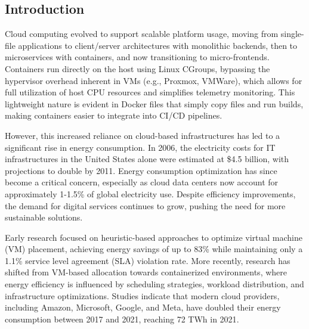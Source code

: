 \begin{multicols}{2}
\tableofcontents
\section{Introduction}
Cloud computing evolved to support scalable platform usage, moving from single-file applications to client/server 
architectures with monolithic backends, then to microservices with containers, and now transitioning to micro-frontends. 
Containers run directly on the host using Linux CGroups, bypassing the hypervisor overhead inherent in VMs (e.g., 
Proxmox, VMWare), which allows for full utilization of host CPU resources and simplifies telemetry monitoring. 
This lightweight nature is evident in Docker files that simply copy files and run builds, making containers easier to integrate 
into CI/CD pipelines.

However, this increased reliance on cloud-based infrastructures has led to a significant rise in energy 
consumption. In 2006, the electricity costs for IT infrastructures in the United States alone were 
estimated at \$4.5 billion, with projections to double by 2011\cite{beloglazov_energy_2010}. Energy 
consumption optimization has since become a critical concern, especially as cloud data centers now account 
for approximately 1-1.5\% of global electricity use\cite{IEADataCentres}. Despite efficiency improvements, the 
demand for digital services continues to grow, pushing the need for more sustainable solutions.

Early research focused on heuristic-based approaches to optimize virtual machine (VM) placement, achieving 
energy savings of up to 83\% while maintaining only a 1.1\% service level agreement (SLA) violation 
rate\cite{beloglazov_energy_2010}. More recently, research has shifted from VM-based allocation towards 
containerized environments, where energy efficiency is influenced by scheduling strategies, workload 
distribution, and infrastructure optimizations. Studies indicate that modern cloud providers, including 
Amazon, Microsoft, Google, and Meta, have doubled their energy consumption between 2017 and 2021, 
reaching 72 TWh in 2021\cite{masanet_2020, hintemann_2022, IEADataCentres}.



\end{multicols}
